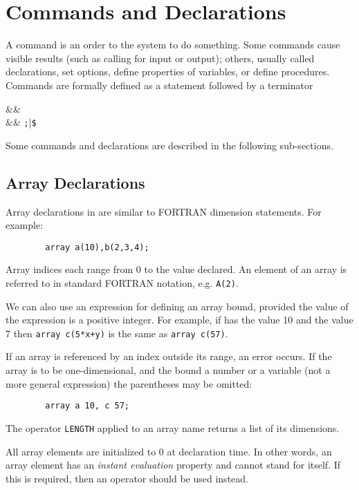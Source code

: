 \chapter{Commands and Declarations}

A command is an order to the system to do something.  Some
commands cause visible results (such as calling for input or output);
others, usually called declarations, set options,
define properties of variables, or define procedures.  Commands are
formally defined as a statement followed by a terminator
\begin{syntaxtable}
   &\BNFprod&  \\
   &\BNFprod& \texttt{;}|\texttt{\$}
\end{syntaxtable}
Some {\REDUCE} commands and declarations are described in the following
sub-sections.

\hypertarget{reserved:ARRAY}{\section{Array Declarations}}

Array declarations in {\REDUCE} are similar to FORTRAN
dimension statements.  For example:
\begin{verbatim}
        array a(10),b(2,3,4);
\end{verbatim}
Array indices each range from 0 to the value declared. An element of an
array is referred to in standard FORTRAN notation, e.g. \texttt{A(2)}.

We can also use an expression for defining an array bound, provided the
value of the expression is a positive integer. For example, if  has the
value 10 and  the value 7 then
\texttt{array c(5*x+y)} is the same as \texttt{array c(57)}.

If an array is referenced by an index outside its range, an error occurs.
If the array is to be one-dimensional, and the bound a number or a variable
(not a more general expression) the parentheses may be omitted:
\begin{verbatim}
        array a 10, c 57;
\end{verbatim}
The operator \texttt{LENGTH} applied to an array name
returns a list of its dimensions.

All array elements are initialized to 0 at declaration time. In other words,
an array element has an \emph{instant evaluation}
property and cannot stand for itself.  If this is required, then an
operator should be used instead.

